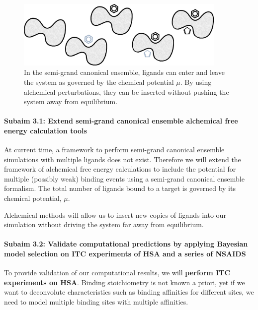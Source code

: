 \documentclass[10pt,final]{article}
\newcommand{\subsubsubsection}[1]{\paragraph*{#1}}
\begin{document}
\begin{figure}[H]
  \centering
  \includegraphics[width=0.9\textwidth]{figures/semi-grand.png}
  \caption{In the semi-grand canonical ensemble, ligands can enter and leave the system as governed by the chemical potential $\mu$. By using alchemical perturbations, they can be inserted without pushing the system away from equilibrium.}
  \label{figure:semigrand}
\end{figure}




\subsubsubsection{Subaim 3.1: Extend semi-grand canonical ensemble alchemical free energy calculation tools}
At current time, a framework to perform semi-grand canonical ensemble simulations with multiple ligands does not exist. Therefore we will extend the framework of alchemical free energy calculations to include the potential for multiple (possibly weak) binding events using a semi-grand canonical ensemble formalism. 
The total number of ligands bound to a target is governed by its chemical potential, $\mu$. 

Alchemical methods will allow us to insert new copies of ligands into our simulation without driving the system far away from equilibrium. 

\subsubsubsection{Subaim 3.2: Validate computational predictions by applying Bayesian model selection on ITC  experiments of HSA and a series of NSAIDS}
To provide validation of our computational results, we will \textbf{perform ITC experiments on HSA}. Binding stoichiometry is not known a priori, yet if we want to deconvolute characteristics such as binding affinities for different sites, we need to model multiple binding sites with multiple affinities.
\end{document}
